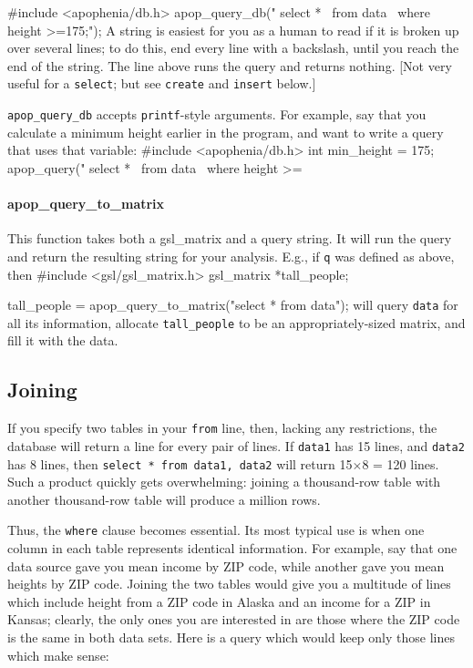 #include <apophenia/db.h>
apop_query_db(" select *        \
                  from data     \
                  where height >=175;");
A string is easiest for you as a human to read if it is
broken up over several lines; to do this, end every line with a
backslash, until you reach the end of the string. The line above runs
the query and returns nothing. [Not very useful for a {\tt select}; but see
{\tt create} and  {\tt insert} below.]

{\tt apop\_query\_db} accepts {\tt printf}-style arguments. For example,
say that you calculate a minimum height earlier in the program, and want
to write a query that uses that variable:
#include <apophenia/db.h>
int min_height	= 175;
apop_query(" select *     \
               from data     \
               where height >=%

\paragraph{apop\_query\_to\_matrix} This function takes both a
gsl\_matrix and a query string. It will run the query and return the
resulting string for your analysis. E.g., if {\tt q} was defined as
above, then 
#include <gsl/gsl_matrix.h>
gsl_matrix *tall_people;

tall_people = apop_query_to_matrix("select * from data");
will query {\tt data} for all its information, allocate {\tt tall\_people} to be an
appropriately-sized matrix, and fill it with the data.

\subsection{Joining}
If you specify two tables in your {\tt from} line, then, lacking any
restrictions, the database will return a line for every pair of lines.
If {\tt data1} has 15 lines, and {\tt data2} has 8 lines, then {\tt select *
from data1, data2} will return 15$\times$8 = 120 lines.  Such a product
quickly gets overwhelming: joining a thousand-row table with another
thousand-row table will produce a million rows.

Thus, the {\tt where} clause becomes essential. Its most typical use is
when one column in each table represents identical information. For
example, say that one data source gave you mean income by ZIP code,
while another gave you mean heights by ZIP code. Joining the two tables
would give you a multitude of lines which include height from a ZIP code
in Alaska and an income for a ZIP in Kansas; clearly, the only ones you
are interested in are those where the ZIP code is the same in both data
sets. Here is a query which would keep only those lines which make
sense:

